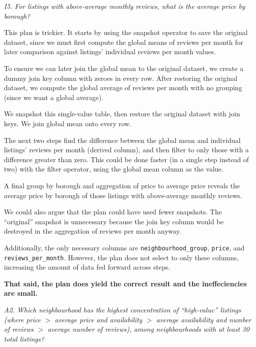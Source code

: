\textit{I5. For listings with above-average monthly reviews, what is the average price by borough?}



This plan is trickier. It starts by using the snapshot operator to save the original dataset, since we must first compute the global means of reviews per month for later comparison against listings' individual reviews per month values.

To ensure we can later join the global mean to the original dataset, we create a dummy join key column with zeroes in every row. After restoring the original dataset, we compute the global average of reviews per month with no grouping (since we want a global average).

We snapshot this single-value table, then restore the original dataset with join keys. We join global mean onto every row.

The next two steps find the difference between the global mean and individual listings' reviews per month (derived column), and then filter to only those with a difference greater than zero. This could be done faster (in a single step instead of two) with the filter operator, using the global mean column as the value.

A final group by borough and aggregation of price to average price reveals the average price by borough of those listings with above-average monthly reviews.

We could also argue that the plan could have used fewer snapshots. The ``original'' snapshot is unnecessary because the join key column would be destroyed in the aggregation of reviews per month anyway.

Additionally, the only necessary columns are \texttt{neighbourhood\_group}, \texttt{price}, and \texttt{reviews\_per\_month}. However, the plan does not select to only these columns, increasing the amount of data fed forward across steps.

\textbf{That said, the plan does yield the correct result and the ineffeciencies are small.}

\break
{}

\textit{A2. Which neighbourhood has the highest concentration of ``high-value'' listings (where price \texorpdfstring{$>$}{is greater than} average price and availability \texorpdfstring{$>$}{is greater than} average availability and number of reviews \texorpdfstring{$>$}{is greater than} average number of reviews), among neighbourhoods with at least 30 total listings?}

